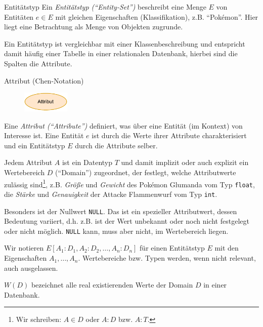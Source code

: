 \begin{defi}{Entitätstyp}
    Ein \emph{Entitätstyp (\enquote{Entity-Set})} beschreibt eine Menge $E$ von Entitäten $e \in E$ mit gleichen Eigenschaften (Klassifikation), z.B. \enquote{Pokémon}.
    Hier liegt eine Betrachtung als Menge von Objekten zugrunde.

    Ein Entitätstyp ist vergleichbar mit einer Klassenbeschreibung und entspricht damit häufig einer Tabelle in einer relationalen Datenbank, hierbei sind die Spalten die Attribute.
\end{defi}

\begin{defi}{Attribut (Chen-Notation)}
    \begin{figure}
        \begin{center}
            \includegraphics[width=0.2\textwidth]{includes/figures/definition_entity_relationship_model_attribute.pdf}
        \end{center}
    \end{figure}
    Eine \emph{Attribut (\enquote{Attribute})} definiert, was über eine Entität (im Kontext) von Interesse ist.
    Eine Entität $e$ ist durch die Werte ihrer Attribute charakterisiert und ein Entitätstyp $E$ durch die Attribute selber.

    Jedem Attribut $A$ ist ein Datentyp $T$ und damit implizit oder auch explizit ein Wertebereich $D$ (\enquote{Domain}) zugeordnet, der festlegt, welche Attributwerte zulässig sind\footnote{Wir schreiben: $A \in D$ oder $A:D$ bzw. $A:T$.}, z.B. \emph{Größe} und \emph{Gewicht} des Pokémon Glumanda vom Typ \texttt{float}, die \emph{Stärke} und \emph{Genauigkeit} der Attacke Flammenwurf vom Typ \texttt{int}.

    Besonders ist der Nullwert \texttt{NULL}.
    Das ist ein spezieller Attributwert, dessen Bedeutung variiert, d.h. z.B. ist der Wert unbekannt oder noch nicht festgelegt oder nicht möglich.
    \texttt{NULL} kann, muss aber nicht, im Wertebereich liegen.

    Wir notieren $E[A_1 : D_1, A_2 : D_2, \ldots, A_n : D_n]$ für einen Entitätstyp $E$ mit den Eigenschaften $A_1, \ldots, A_n$.
    Wertebereiche bzw. Typen werden, wenn nicht relevant, auch ausgelassen.

    $W(D)$ bezeichnet alle real existierenden Werte der Domain $D$ in einer Datenbank.
\end{defi}

